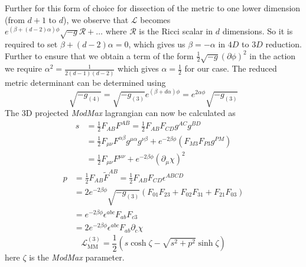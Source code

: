 Further for this form of choice for dissection of the metric to one lower dimension (from $d+1$ to $d$), we observe that $\mathcal{L}$ becomes $e^{(\beta+(d-2)\alpha)\phi}\sqrt{-g}\mathcal{R}+\hdots \text{ where } \mathcal{R}$ is the Ricci scalar in $d$ dimensions. So it is required to set $\beta+(d-2)\alpha=0$, which gives us $\beta=-\alpha$ in $4D$ to $3D$ reduction. Further to ensure that we obtain a term of the form $\frac{1}{2}\sqrt{-g}\left(\partial\phi\right)^2 $  in the action we require $\alpha^2 = \displaystyle\frac{1}{2(d-1)(d-2)}$ which gives $\alpha = \frac{1}{2}$ for our case. The reduced metric determinant can be determined using 
\begin{equation*}
    \sqrt{-g_{(4)}} = \sqrt{-g_{(3)}}e^{(\beta+d\alpha)\phi} = e^{2\alpha\phi}\sqrt{-g_{(3)}}
\end{equation*}
The 3D projected \textit{ModMax} lagrangian can now be calculated as
\begin{align*}
    s&=\frac{1}{2}F_{AB}F^{AB} = \frac{1}{2}F_{AB}F_{CD}g^{AC}g^{BD}\\ 
     &= \frac{1}{2}F_{\mu\nu}F^{\alpha\beta}g^{\mu\alpha}g^{\nu\beta} + e^{-2\beta\phi}\left(F_{M3}F_{P3}g^{PM}\right) \\ 
    &=\frac{1}{2}F_{\mu\nu}F^{\mu\nu} + e^{-2\beta\phi}(\partial_{\mu}\chi)^2
\end{align*}
\begin{align*}
    p&=\frac{1}{2}F_{AB}\tilde{F}^{AB} = \frac{1}{2}F_{AB}F_{CD}\epsilon^{ABCD} \\ 
    &= 2e^{-2\beta\phi}\sqrt{-g_{(3)}} \left ( F_{01}F_{23} + F_{02}F_{31} + F_{21}F_{03} \right ) \\ 
    &= e^{-2\beta\phi}\epsilon^{abc}F_{ab}F_{c3} \\ 
    &= 2e^{-2\beta\phi}\epsilon^{abc}F_{ab}\partial_{c}\chi
\end{align*}
\begin{equation}
    \mathcal{L}_{\text{MM}}^{(3)} = \frac{1}{2}\left(s\cosh\zeta - \sqrt{s^2 + p^2}\sinh\zeta\right)
\end{equation}
here $\zeta$ is the \textit{ModMax} parameter.

